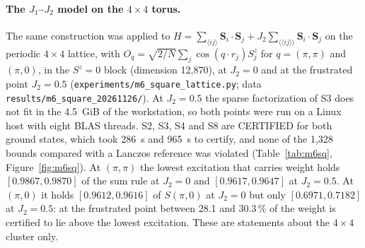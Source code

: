 \documentclass[11pt,a4paper]{article}
\newcommand{\code}[1]{\texttt{#1}}
\newcommand{\status}[1]{\textsf{#1}}
\newcommand{\CERT}{\status{CERTIFIED}}
\begin{document}
\paragraph{The $J_1$--$J_2$ model on the $4\times4$ torus.}
The same construction was applied to $H=\sum_{\langle ij\rangle}\mathbf S_i\cdot\mathbf S_j
+J_2\sum_{\langle\langle ij\rangle\rangle}\mathbf S_i\cdot\mathbf S_j$ on the periodic $4\times4$ lattice, with
$O_q=\sqrt{2/N}\sum_j\cos(q\cdot r_j)S^z_j$ for $q=(\pi,\pi)$ and $(\pi,0)$, in the $S^z=0$ block (dimension 12,870),
at $J_2=0$ and at the frustrated point $J_2=0.5$ (\code{experiments/m6\_square\_lattice.py}; data
\code{results/m6\_square\_20261126/}). At $J_2=0.5$ the sparse factorization of S3 does not fit in the 4.5~GiB of the
workstation, so both points were run on a Linux host with eight BLAS threads. S2, S3, S4 and S8 are \CERT{} for both
ground states, which took 286~s and 965~s to certify, and none of the 1,328 bounds compared with a
Lanczos reference was violated (Table~\ref{tab:m6sq}, Figure~\ref{fig:m6sq}). At $(\pi,\pi)$ the lowest excitation
that carries weight holds $[0.9867, 0.9870]$ of the sum rule at $J_2=0$ and $[0.9617, 0.9647]$
at $J_2=0.5$. At $(\pi,0)$ it holds $[0.9612, 0.9616]$ of $S(\pi,0)$ at $J_2=0$ but only
$[0.6971, 0.7182]$ at $J_2=0.5$: at the frustrated point between 28.1 and
30.3\,\% of the weight is certified to lie above the lowest excitation. These are statements about the
$4\times4$ cluster only.

\begin{table}[ht]
\centering\small
\caption{Certified bounds on the integrated $S^{zz}(q,\omega)$ of the $J_1$--$J_2$ model on the $4\times4$ torus
($S^z=0$ block, dimension 12,870; \code{docs/results/RESULT\_m6\_spectral\_bounds.md}; development version 3.3.0.dev0
at commit 0fc1408, Linux host, eight BLAS threads). ``Certify'' is the time to certify the ground state, S3 included.
Widths are the mean widths of the 83 bounds at $K=32$ and $K=256$. The last column is the certified fraction $W_1/S(q)$
of the lowest window at $K=256$. Every bound holds against the Lanczos reference. Certified interval ends are
rounded outward at the printed digit.}
\label{tab:m6sq}
\end{table}
\end{document}
